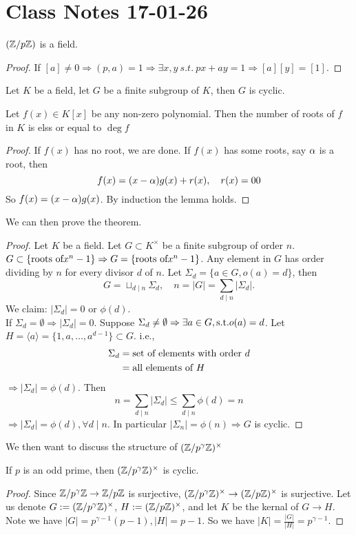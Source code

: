 \documentclass{mynotes}
\begin{document}
\section{Class Notes 17-01-26}
\begin{theorem}
	$(\mathbb{Z}/p\mathbb{Z})$ is a field.
\end{theorem}
\begin{proof}
	If $[a]\ne0 \Rightarrow (p,a) = 1 \Rightarrow \exists x,y\ s.t.\ px+ay = 1\Rightarrow [a][y] = [1]$.
\end{proof}
\begin{theorem}
	Let $K$ be a field, let $G$ be a finite subgroup of $K$, then $G$ is cyclic.
\end{theorem}
\begin{lemma}
	Let $f(x)\in K[x]$ be any non-zero polynomial. Then the number of roots of $f$ in $K$ is elss or equal to $\deg{f}$
\end{lemma}
\begin{proof}
If $f(x)$ has no root, we are done. If $f(x)$ has some roots, say $\alpha$ is a root, then $$f(x) = (x-\alpha)g(x)+ r(x),\quad r(x) = 00$$So $f(x) = (x-\alpha)g(x)$. By induction the lemma holds.
\end{proof}
We can then prove the theorem.
\begin{proof}
	Let $K$ be a field. Let $G\subset K^{\times}$ be a finite subgroup of order $n$. $G\subset \{\hbox{roots of} x^n-1\}\Rightarrow G = \{\hbox{roots of} x^n -1\}$. Any element in $G$ has order dividing by $n$ for every divisor $d$ of $n$. Let $\Sigma_d = \{a\in G, o(a) = d\}$, then $$G=\sqcup_{d\mid n} \Sigma_d, \quad n=|G| = \sum_{d\mid n}|\Sigma_d|.$$
	We claim: $|\Sigma_d| = 0$ or $\phi(d)$.\\
	If $\Sigma_d = \emptyset\Rightarrow |\Sigma_d| = 0$. Suppose $\Sigma_d\ne \emptyset\Rightarrow \exists a\in G, \hbox{s.t.} o(a) = d$. Let $H =\langle a\rangle = \{1,a,\ldots, a^{d-1}\}\subset G.$
	i.e.,\begin{align*}\Sigma_d &=\hbox{set of elements with order } d\\
	&= \hbox{all elements of } H
	\end{align*}
	$\Rightarrow |\Sigma_d| = \phi(d)$. Then $$n=\sum_{d\mid n}|\Sigma_d|\le \sum_{d\mid n}\phi(d) = n$$
	$\Rightarrow |\Sigma_d| = \phi(d), \forall d\mid n$. In particular $|\Sigma_n| = \phi(n)\Rightarrow G$ is cyclic.
\end{proof}
We then want to discuss the structure of $(\mathbb{Z}/p^{\gamma}\mathbb{Z})^{\times}$
\begin{theorem}
	If $p$ is an odd prime, then $(\mathbb{Z}/p^{\gamma}\mathbb{Z})^{\times}$ is cyclic.
\end{theorem}
\begin{proof}
	Since $\mathbb{Z}/p^{\gamma}\mathbb{Z}\rightarrow\mathbb{Z}/p\mathbb{Z}$ is surjective, $(\mathbb{Z}/p^{\gamma}\mathbb{Z})^{\times}\rightarrow(\mathbb{Z}/p\mathbb{Z})^{\times}$ is surjective. Let us denote $G:=(\mathbb{Z}/p^{\gamma}\mathbb{Z})^{\times}$, $H:=(\mathbb{Z}/p\mathbb{Z})^{\times}$, and let $K$ be the kernal of $G\rightarrow H$. Note we have $|G|=p^{\gamma -1 }(p-1), |H| = p-1$. So we have $|K| = \frac{|G|}{|H|} = p^{\gamma -1}$.
\end{proof}
\end{document}

